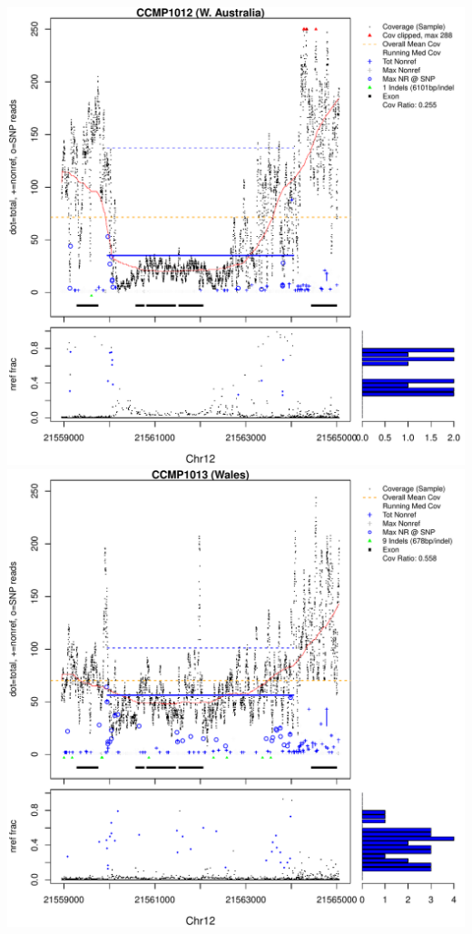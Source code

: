 \documentclass{article}\usepackage[]{graphicx}\usepackage[]{color}
\makeatletter
\def\maxwidth{ %
  \ifdim\Gin@nat@width>\linewidth
    \linewidth
  \else
    \Gin@nat@width
  \fi
}
\newenvironment{knitrout}{}{} %
\makeatother
\begin{document}
\begin{knitrout}
{\includegraphics[width=\maxwidth]{figs-knitr/unnamed-chunk-53-3} 
\includegraphics[width=\maxwidth]{figs-knitr/unnamed-chunk-53-4} 
}
\end{knitrout}
\end{document}
